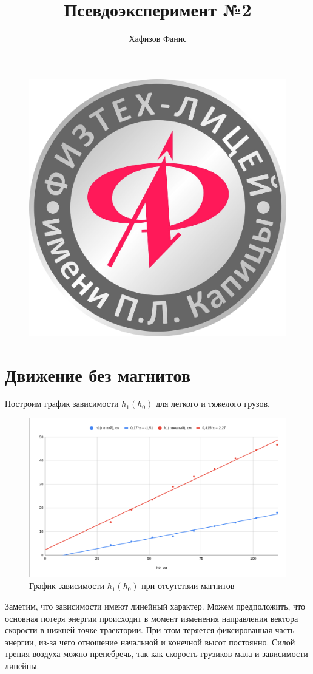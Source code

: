 \documentclass[12pt]{article}
\title{Псевдоэксперимент №2}
\author{Хафизов Фанис}
\begin{document}
	\begin{figure}
		\centering
		\includegraphics[width=0.3\linewidth]{logo}
	\end{figure}
	\maketitle
	\newpage
	\section{Движение без магнитов}
	Построим график зависимости $h_1(h_0)$ для легкого и тяжелого грузов.
	\begin{figure}[H]
		\centering
		\includegraphics[width=\linewidth]{graph1}
		\caption{График зависимости $h_1(h_0)$ при отсутствии магнитов}
	\end{figure}
	Заметим, что зависимости имеют линейный характер. Можем предположить, что основная потеря энергии происходит в момент изменения направления вектора скорости в нижней точке траектории. При этом теряется фиксированная часть энергии, из-за чего отношение начальной и конечной высот постоянно. Силой трения воздуха можно пренебречь, так как скорость грузиков мала и зависимости линейны.
\end{document}
